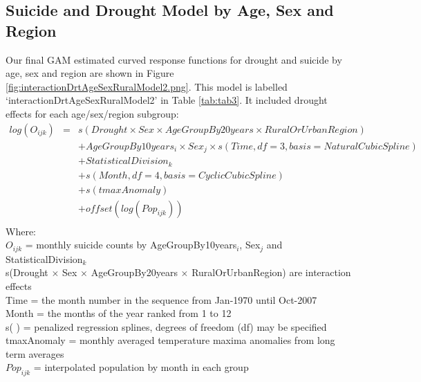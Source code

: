 \documentclass[a4paper]{article}                %
\begin{document}
        \clearpage



\subsection{Suicide and Drought Model by Age, Sex and Region}

        Our final GAM estimated curved response functions for drought and suicide by age, sex and region are shown in Figure \ref{fig:interactionDrtAgeSexRuralModel2.png}. This model is labelled `interactionDrtAgeSexRuralModel2' in Table \ref{tab:tab3}.  It included drought effects for each age/sex/region subgroup:
\begin{eqnarray*}
        log(O_{ijk})  & = & s(Drought \times Sex \times AgeGroupBy20years \times RuralOrUrbanRegion)  \\
        & &   + AgeGroupBy10years_{i} \times Sex_{j} \times s(Time, df = 3, basis = NaturalCubic Spline) \\
        & &   + StatisticalDivision_{k}  \\
        & &     + s(Month, df = 4, basis = CyclicCubicSpline) \\
        & &     + s(tmaxAnomaly) \\
        & &   + offset(log(Pop_{ijk}))\\
        \end{eqnarray*}
        \noindent Where:\\
        \indent $O_{ijk}$ = monthly suicide counts by AgeGroupBy10years$_{i}$, Sex$_{j}$ and StatisticalDivision$_{k}$ \\
        \indent  s(Drought $\times$ Sex $\times$ AgeGroupBy20years $\times$ RuralOrUrbanRegion) are interaction effects \\
        \indent Time = the month number in the sequence from Jan-1970 until Oct-2007\\
        \indent Month = the months of the year ranked from 1 to 12 \\
        \indent s( ) = penalized regression splines, degrees of freedom (df) may be specified \\
        \indent tmaxAnomaly = monthly averaged temperature maxima anomalies from long term averages \\
        \indent $Pop_{ijk}$ = interpolated population by month in each group\\
\end{document}

